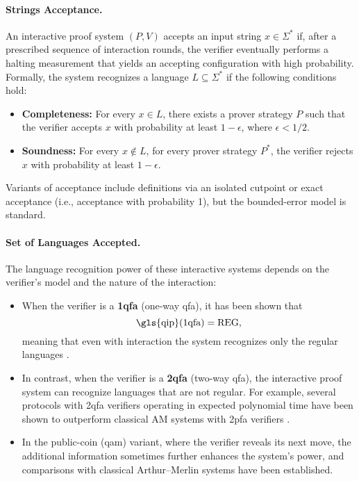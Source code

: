 \paragraph{Strings Acceptance.}
An interactive proof system $(P,V)$ accepts an input string $x\in\Sigma^*$ if, after a prescribed sequence of interaction rounds, the verifier eventually performs a halting measurement that yields an accepting configuration with high probability. Formally, the system recognizes a language $L\subseteq\Sigma^*$ if the following conditions hold:
\begin{itemize}
  \item \textbf{Completeness:} For every $x\in L$, there exists a prover strategy $P$ such that the verifier accepts $x$ with probability at least $1-\epsilon$, where $\epsilon<1/2$.
  \item \textbf{Soundness:} For every $x\notin L$, for every prover strategy $P^*$, the verifier rejects $x$ with probability at least $1-\epsilon$.
\end{itemize}
Variants of acceptance include definitions via an isolated cutpoint or exact acceptance (i.e., acceptance with probability 1), but the bounded-error model is standard.

\paragraph{Set of Languages Accepted.}
The language recognition power of these interactive systems depends on the verifier’s model and the nature of the interaction:
\begin{itemize}
  \item When the verifier is a \textbf{1qfa} (one-way qfa), it has been shown that
  \[
  \text{\gls{qip}(1qfa)} = \text{REG},
  \]
  meaning that even with interaction the system recognizes only the regular languages \cite{NISHIMURA2009255}.
  \item In contrast, when the verifier is a \textbf{2qfa} (two-way qfa), the interactive proof system can recognize languages that are not regular. For example, several protocols with 2qfa verifiers operating in expected polynomial time have been shown to outperform classical AM systems with 2pfa verifiers \cite{ZHENG2015197, nishimura2015interactive}.
  \item In the public-coin (\gls{qam}) variant, where the verifier reveals its next move, the additional information sometimes further enhances the system’s power, and comparisons with classical Arthur–Merlin systems have been established.
\end{itemize}

